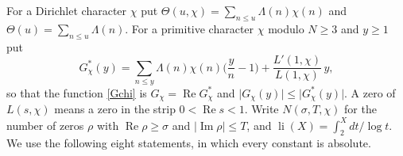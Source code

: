 For a Dirichlet character $\chi$ put $\Theta(u,\chi)=\sum_{n\le u}\Lambda(n)\chi(n)$ and $\Theta(u)=\sum_{n\le u}\Lambda(n)$. For a primitive character $\chi$ modulo $N\ge3$ and $y\ge1$ put
\begin{equation}\label{Gstar}
G^\ast_\chi(y)=\sum_{n\le y}\Lambda(n)\chi(n)\Big(\frac yn-1\Big)+\frac{L'(1,\chi)}{L(1,\chi)}\,y ,
\end{equation}
so that the function \eqref{Gchi} is $G_\chi=\operatorname{Re}G^\ast_\chi$ and $\lvert G_\chi(y)\rvert\le\lvert G^\ast_\chi(y)\rvert$. A zero of $L(s,\chi)$ means a zero in the strip $0<\operatorname{Re}s<1$. Write $N(\sigma,T,\chi)$ for the number of zeros $\rho$ with $\operatorname{Re}\rho\ge\sigma$ and $\lvert\operatorname{Im}\rho\rvert\le T$, and $\operatorname{li}(X)=\int_2^Xdt/\log t$. We use the following eight statements, in which every constant is absolute.
